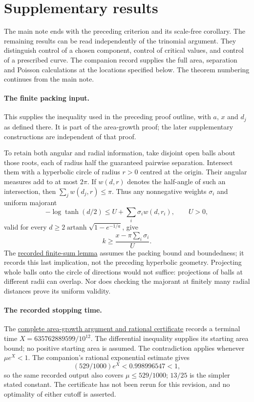 \documentclass[11pt]{article}
\begin{document}
\clearpage
\hypertarget{supplementary-results}{}
\section*{Supplementary results}
The main note ends with the preceding criterion and its scale-free
corollary. The remaining results can be read independently of the
trinomial argument. They distinguish control of a chosen component,
control of critical values, and control of a prescribed curve. The
companion record supplies the full area, separation and Poisson
calculations at the locations specified below. The theorem numbering
continues from the main note.

\paragraph{The finite packing input.}
\hypertarget{circle-packing-inputs}{}
This supplies the inequality used in the preceding proof outline, with
$a$, $x$ and $d_j$ as defined there. It is part of the area-growth proof;
the later supplementary constructions are independent of that proof.

To retain both angular and radial information, take disjoint open balls
about those roots, each of radius half the guaranteed pairwise
separation. Intersect them with a hyperbolic circle of radius $r>0$
centred at the origin. Their angular measures add to at most $2\pi$. If $w(d,r)$ denotes the half-angle of
such an intersection, then $\sum_j w(d_j,r)\le\pi$. Thus any
nonnegative weights $\sigma_i$ and uniform majorant
\[
 -\log\tanh(d/2)\le U+\sum_i\sigma_iw(d,r_i),\qquad U>0,
\]
valid for every $d\ge2\operatorname{artanh}\sqrt{1-e^{-1/a}}$, give
\[
 k\ge\frac{x-\pi\sum_i\sigma_i}{U}.
\]
The \href{https://github.com/wcook04/plectis-erdos/blob/f36a98bf3d3e6f65f1074e3b800e3293d5b8a51a/ErdosProblems/Erdos1041/PaperFiniteDual.lean#L68}{recorded finite-sum lemma}
assumes the packing bound and boundedness; it records this last
implication, not the preceding hyperbolic geometry.
Projecting whole balls onto the circle of directions would not suffice:
projections of balls at different radii can overlap. Nor does checking
the majorant at finitely many radial distances prove its uniform validity.

\paragraph{The recorded stopping time.}
\hypertarget{certificate-stopping-time}{}
The \href{https://github.com/wcook04/plectis-erdos/blob/f36a98bf3d3e6f65f1074e3b800e3293d5b8a51a/ErdosProblems/Erdos1041/AngularBudgetLowCriticalClosure.md}{complete area-growth argument and rational certificate}
records a terminal time $X=635762889599/10^{12}$. The differential
inequality supplies its starting area bound; no positive starting area
is assumed. The contradiction applies whenever $\mu e^X<1$.
The companion's rational exponential estimate gives
\[
 (529/1000)e^X<0.998996547<1,
\]
so the same recorded output also covers $\mu\le529/1000$; $13/25$ is
the simpler stated constant. The certificate has not been rerun for this
revision, and no optimality of either cutoff is asserted.
\end{document}
